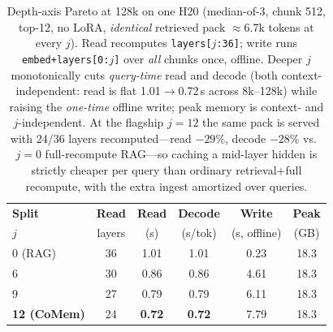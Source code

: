 \begin{table}[t]
\centering
\small
\begin{tabular}{@{}lccccc@{}}
\toprule
\textbf{Split} & \textbf{Read} & \textbf{Read} & \textbf{Decode} & \textbf{Write} & \textbf{Peak} \\
$j$ & layers & (s) & (s/tok) & (s, offline) & (GB) \\
\midrule
0 (RAG) & 36 & 1.01 & 1.01 & 0.23 & 18.3 \\
6 & 30 & 0.86 & 0.86 & 4.61 & 18.3 \\
9 & 27 & 0.79 & 0.79 & 6.11 & 18.3 \\
\textbf{12 (CoMem)} & 24 & \textbf{0.72} & \textbf{0.72} & 7.79 & 18.3 \\
\bottomrule
\end{tabular}
\caption{Depth-axis Pareto at 128k on one H20 (median-of-3, chunk 512, top-12,
no LoRA, \emph{identical} retrieved pack $\approx$6.7k tokens at every $j$). Read
recomputes \texttt{layers[$j$:36]}; write runs \texttt{embed+layers[0:$j$]} over
\emph{all} chunks once, offline. Deeper $j$ monotonically cuts \emph{query-time}
read and decode (both context-independent: read is flat 1.01$\to$0.72\,s across
8k--128k) while raising the \emph{one-time} offline write; peak memory is
context- and $j$-independent. At the flagship $j{=}12$ the same pack is served
with 24/36 layers recomputed---read $-29\%$, decode $-28\%$ vs.\ $j{=}0$
full-recompute RAG---so caching a mid-layer hidden is strictly cheaper per query
than ordinary retrieval$+$full recompute, with the extra ingest amortized over
queries.}
\label{tab:pareto}
\end{table}
